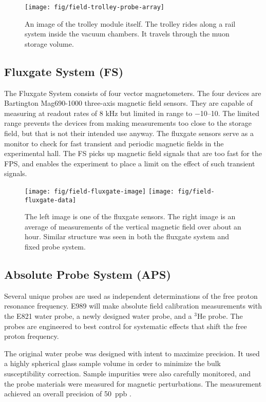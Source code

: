 \begin{figure}
\label{fig:field-trolley-probe-array}
\centering
\texttt{[image: fig/field-trolley-probe-array]}
\caption{An image of the trolley module itself.  The trolley rides along a rail system inside the vacuum chambers.  It travels through the muon storage volume.}
\end{figure}

\subsection{Fluxgate System (FS)}

The Fluxgate System consists of four vector magnetometers.  The four devices are Bartington Mag690-1000 three-axis magnetic field sensors.  They are capable of measuring at readout rates of 8 kHz but limited in range to \SIrange{-10}{+10}{\gauss}.  The limited range prevents the devices from making measurements too close to the storage field, but that is not their intended use anyway.  The fluxgate sensors serve as a monitor to check for fast transient and periodic magnetic fields in the experimental hall.  The FS picks up magnetic field signals that are too fast for the FPS, and enables the experiment to place a limit on the effect of such transient signals.

\begin{figure}
\label{fig:field-fluxgates}
\texttt{[image: fig/field-fluxgate-image]}
\texttt{[image: fig/field-fluxgate-data]}
\caption{The left image is one of the fluxgate sensors.  The right image is an average of measurements of the vertical magnetic field over about an hour.  Similar structure was seen in both the fluxgate system and fixed probe system.}
\end{figure}

\subsection{Absolute Probe System (APS)}

Several unique probes are used as independent determinations of the free proton resonance frequency.  E989 will make absolute field calibration measurements with the E821 water probe, a newly designed water probe, and a $\mathrm{^3He}$ probe. The probes are engineered to best control for systematic effects that shift the free proton frequency.

The original water probe was designed with intent to maximize precision.  It used a highly spherical glass sample volume in order to minimize the bulk susceptibility correction.  Sample impurities were also carefully monitored, and the probe materials were measured for magnetic perturbations.  The measurement achieved an overall precision of \SI{50}{ppb} \cite{e821-abs-probe}.

